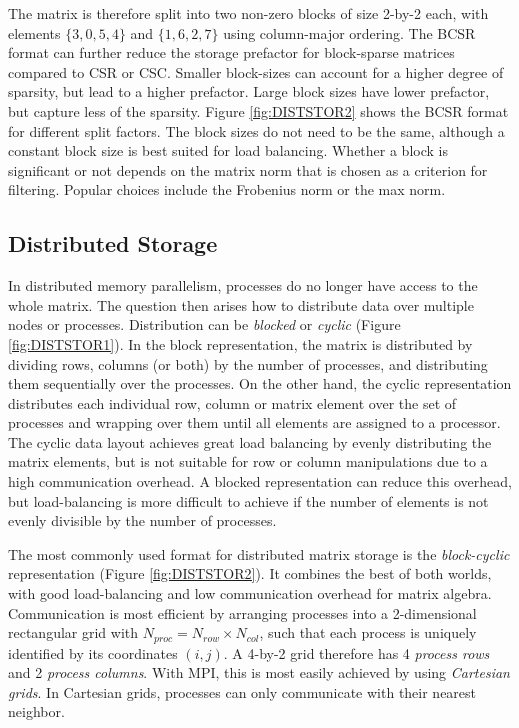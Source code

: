\noindent The matrix is therefore split into two non-zero blocks of size 2-by-2 each, with elements $\{3,0,5,4\}$ and $\{1,6,2,7\}$ using column-major ordering. The BCSR format can further reduce the storage prefactor for block-sparse matrices compared to CSR or CSC. Smaller block-sizes can account for a higher degree of sparsity, but lead to a higher prefactor. Large block sizes have lower prefactor, but capture less of the sparsity. Figure \ref{fig:DISTSTOR2} shows the BCSR format for different split factors. The block sizes do not need to be the same, although a constant block size is best suited for load balancing. Whether a block is significant or not depends on the matrix norm that is chosen as a criterion for filtering. Popular choices include the Frobenius norm or the max norm. 

\subsection{Distributed Storage}

In distributed memory parallelism, processes do no longer have access to the whole matrix. The question then arises how to distribute data over multiple nodes or processes. Distribution can be \emph{blocked} or \emph{cyclic} (Figure \ref{fig:DISTSTOR1}). In the block representation, the matrix is distributed by dividing rows, columns (or both) by the number of processes, and distributing them sequentially over the processes. On the other hand, the cyclic representation distributes each individual row, column or matrix element over the set of processes and wrapping over them until all elements are assigned to a processor. The cyclic data layout achieves great load balancing by evenly distributing the matrix elements, but is not suitable for row or column manipulations due to a high communication overhead. A blocked representation can reduce this overhead, but load-balancing is more difficult to achieve if the number of elements is not evenly divisible by the number of processes. 

The most commonly used format for distributed matrix storage is the \emph{block-cyclic} representation (Figure \ref{fig:DISTSTOR2}). It combines the best of both worlds, with good load-balancing and low communication overhead for matrix algebra. Communication is most efficient by arranging processes into a 2-dimensional rectangular grid with $N_{proc} = N_{row} \times N_{col}$, such that each process is uniquely identified by its coordinates $(i,j)$. A 4-by-2 grid therefore has 4 \emph{process rows} and 2 \emph{process columns}. With MPI, this is most easily achieved by using \emph{Cartesian grids}. In Cartesian grids, processes can only communicate with their nearest neighbor. 

